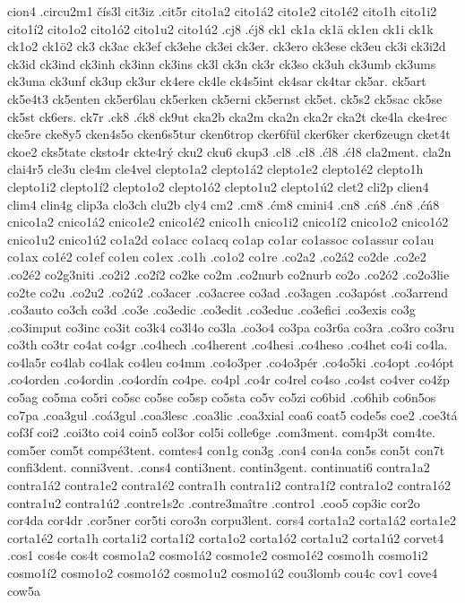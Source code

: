 cion4
.circu2m1
čís3l
cit3iz
.cit5r
cito1a2
cito1á2
cito1e2
cito1é2
cito1h
cito1i2
cito1í2
cito1o2
cito1ó2
cito1u2
cito1ú2
.cj8
.ćj8
ck1
ck1a
ck1ä
ck1en
ck1i
ck1k
ck1o2
ck1ö2
ck3
ck3ac
ck3ef
ck3ehe
ck3ei
ck3er.
ck3ero
ck3ese
ck3eu
ck3i
ck3i2d
ck3id
ck3ind
ck3inh
ck3inn
ck3ins
ck3l
ck3n
ck3r
ck3so
ck3uh
ck3umb
ck3ums
ck3una
ck3unf
ck3up
ck3ur
ck4ere
ck4le
ck4s5int
ck4sar
ck4tar
ck5ar.
ck5art
ck5e4t3
ck5enten
ck5er6lau
ck5erken
ck5erni
ck5ernst
ck5et.
ck5s2
ck5sac
ck5se
ck5st
ck6ers.
ck7r
.ck8
.ćk8
ck9ut
cka2b
cka2m
cka2n
cka2r
cka2t
cke4la
cke4rec
cke5re
cke8y5
cken4s5o
cken6s5tur
cken6trop
cker6fül
cker6ker
cker6zeugn
cket4t
ckoe2
cks5tate
cksto4r
ckte4rý
cku2
cku6
ckup3
.cl8
.cł8
.ćl8
.ćł8
cla2ment.
cla2n
clai4r5
cle3u
cle4m
cle4vel
clepto1a2
clepto1á2
clepto1e2
clepto1é2
clepto1h
clepto1i2
clepto1í2
clepto1o2
clepto1ó2
clepto1u2
clepto1ú2
clet2
cli2p
clien4
clim4
clin4g
clip3a
clo3ch
clu2b
cly4
cm2
.cm8
.ćm8
cmini4
.cn8
.cń8
.ćn8
.ćń8
cnico1a2
cnico1á2
cnico1e2
cnico1é2
cnico1h
cnico1i2
cnico1í2
cnico1o2
cnico1ó2
cnico1u2
cnico1ú2
co1a2d
co1acc
co1acq
co1ap
co1ar
co1assoc
co1assur
co1au
co1ax
co1é2
co1ef
co1en
co1ex
.co1h
.co1o2
co1re
.co2a2
.co2á2
co2de
.co2e2
.co2é2
co2g3niti
.co2i2
.co2í2
co2ke
co2m
.co2nurb
co2nurb
co2o
.co2ó2
.co2o3lie
co2te
co2u
.co2u2
.co2ú2
.co3acer
.co3acree
co3ad
.co3agen
.co3apóst
.co3arrend
.co3auto
co3ch
co3d
.co3e
.co3edic
.co3edit
.co3educ
.co3efici
.co3exis
co3g
.co3imput
co3inc
co3it
co3k4
co3l4o
co3la
.co3o4
co3pa
co3r6a
co3ra
.co3ro
co3ru
co3th
co3tr
co4at
co4gr
.co4hech
.co4herent
.co4hesi
.co4heso
.co4het
co4i
co4la.
co4la5r
co4lab
co4lak
co4leu
co4mm
.co4o3per
.co4o3pér
.co4o5ki
.co4opt
.co4ópt
.co4orden
.co4ordin
.co4ordín
co4pe.
co4pl
.co4r
co4rel
co4so
.co4st
co4ver
co4žp
co5ag
co5ma
co5ri
co5sc
co5se
co5sp
co5sta
co5v
co5zi
co6bid
.co6hib
co6n5os
co7pa
.coa3gul
.coá3gul
.coa3lesc
.coa3lic
.coa3xial
coa6
coat5
code5s
coe2
.coe3tá
cof3f
coi2
.coi3to
coi4
coin5
col3or
col5i
colle6ge
.com3ment.
com4p3t
com4te.
com5er
com5t
compé3tent.
comtes4
con1g
con3g
.con4
con4a
con5s
con5t
con7t
confi3dent.
conni3vent.
.cons4
conti3nent.
contin3gent.
continuati6
contra1a2
contra1á2
contra1e2
contra1é2
contra1h
contra1i2
contra1í2
contra1o2
contra1ó2
contra1u2
contra1ú2
.contre1s2c
.contre3maître
.contro1
.coo5
cop3ic
cor2o
cor4da
cor4dr
.cor5ner
cor5ti
coro3n
corpu3lent.
cors4
corta1a2
corta1á2
corta1e2
corta1é2
corta1h
corta1i2
corta1í2
corta1o2
corta1ó2
corta1u2
corta1ú2
corvet4
.cos1
cos4e
cos4t
cosmo1a2
cosmo1á2
cosmo1e2
cosmo1é2
cosmo1h
cosmo1i2
cosmo1í2
cosmo1o2
cosmo1ó2
cosmo1u2
cosmo1ú2
cou3lomb
cou4c
cov1
cove4
cow5a
